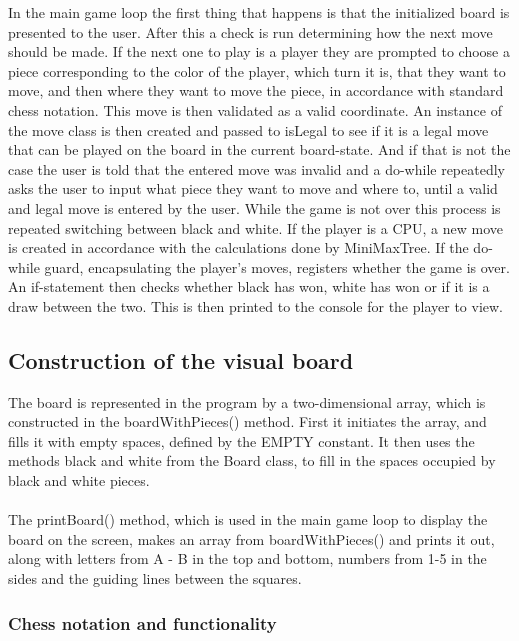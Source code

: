 \documentclass[12pt, a4paper]{article}
\begin{document}
	In the main game loop the first thing that happens is that the initialized board is presented to the user. After this a check is run determining how the next move should be made. If the next one to play is a player they are prompted to choose a piece corresponding to the color of the player, which turn it is, that they want to move, and then where they want to move the piece, in accordance with standard chess notation. This move is then validated as a valid coordinate. An instance of the move class is then created and passed to isLegal to see if it is a legal move that can be played on the board in the current board-state. And if that is not the case the user is told that the entered move was invalid and a do-while repeatedly asks the user to input what piece they want to move and where to, until a valid and legal move is entered by the user. While the game is not over this process is repeated switching between black and white. If the player is a CPU, a new move is created in accordance with the calculations done by MiniMaxTree. If the do-while guard, encapsulating the player's moves, registers whether the game is over. An if-statement then checks whether black has won, white has won or if it is a draw between the two. This is then printed to the console for the player to view.
	
	\subsection{Construction of the visual board}
	
	The board is represented in the program by a two-dimensional array, which is constructed in the boardWithPieces() method.
	First it initiates the array, and fills it with empty spaces, defined by the EMPTY constant.
	It then uses the methods black and white from the Board class, to fill in the spaces occupied by black and white pieces.
	\\\\
	
	The printBoard() method, which is used in the main game loop to display the board on the screen, makes an array from boardWithPieces() and prints it out, along with letters from A - B in the top and bottom, numbers from 1-5 in the sides and the guiding lines between the squares.
	
	\subsubsection{Chess notation and functionality}
	
\end{document}
